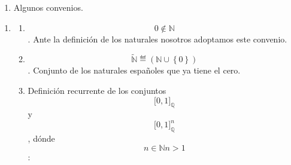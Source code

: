 \begin{enumerate}
\def\labelenumi{\arabic{enumi}.}
\tightlist
\item
  Algunos convenios.
\end{enumerate}

\begin{enumerate}
\def\labelenumi{\arabic{enumi}.}
\item
  \begin{enumerate}
  \def\labelenumii{\arabic{enumii}.}
  \item
    \[0 \notin \mathbb{N}\]. Ante la definición de los naturales
    nosotros adoptamos este convenio.
  \item
    \[\widetilde{\mathbb{N}} ≝ \left( {\mathbb{N} \cup \left\{ 0 \right\}} \right)\].
    Conjunto de los naturales españoles que ya tiene el cero.
  \item
    Definición recurrente de los conjuntos
    \[\lbrack 0,1\rbrack_{\mathbb{Q}}\]y
    \[\lbrack 0,1\rbrack_{\mathbb{Q}}^{n}\], dónde
    \[{n \in \mathbb{N}}{n > 1}\]:


\end{enumerate}
\end{enumerate}
